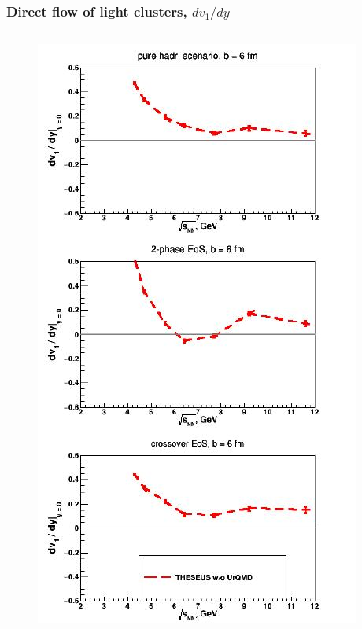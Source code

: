 \documentclass[dvipsnames] {beamer}
\begin{document}
\begin{frame}
  \frametitle{\bf \centering Direct flow of light clusters,  $dv_{1} / dy$}
  \begin{columns}[c]
    \begin{block}{}
      \begin{figure}[H]
        \includegraphics[width=1.0\textwidth]{lightClusters.jpg}
      \end{figure}
    \end{block}
  

\end{columns}
\end{frame}
\end{document}
